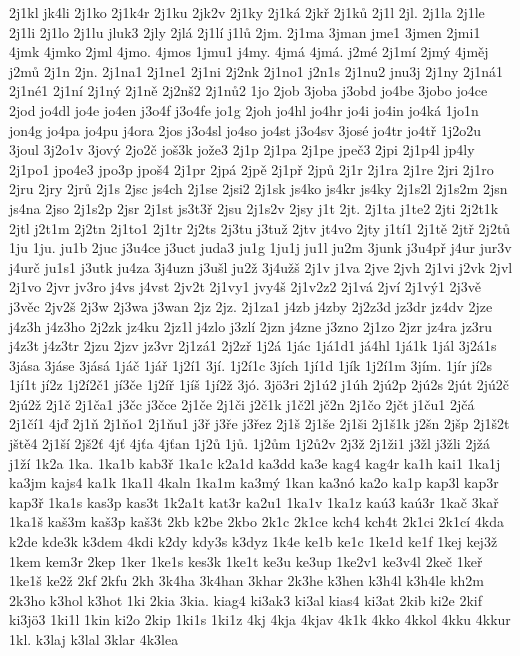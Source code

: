 2j1kl
jk4li
2j1ko
2j1k4r
2j1ku
2jk2v
2j1ky
2j1ká
2jkř
2j1ků
2j1l
2jl.
2j1la
2j1le
2j1li
2j1lo
2j1lu
jluk3
2jly
2jlá
2j1lí
j1lů
2jm.
2j1ma
3jman
jme1
3jmen
2jmi1
4jmk
4jmko
2jml
4jmo.
4jmos
1jmu1
j4my.
4jmá
4jmá.
j2mé
2j1mí
2jmý
4jměj
j2mů
2j1n
2jn.
2j1na1
2j1ne1
2j1ni
2j2nk
2j1no1
j2n1s
2j1nu2
jnu3j
2j1ny
2j1ná1
2j1né1
2j1ní
2j1ný
2j1ně
2j2nš2
2j1nů2
1jo
2job
3joba
j3obd
jo4be
3jobo
jo4ce
2jod
jo4dl
jo4e
jo4en
j3o4f
j3o4fe
jo1g
2joh
jo4hl
jo4hr
jo4i
jo4in
jo4ká
1jo1n
jon4g
jo4pa
jo4pu
j4ora
2jos
j3o4sl
jo4so
jo4st
j3o4sv
3josé
jo4tr
jo4tř
1j2o2u
3joul
3j2o1v
3jový
2jo2č
još3k
jože3
2j1p
2j1pa
2j1pe
jpeč3
2jpi
2j1p4l
jp4ly
2j1po1
jpo4e3
jpo3p
jpoš4
2j1pr
2jpá
2jpě
2j1př
2jpů
2j1r
2j1ra
2j1re
2jri
2j1ro
2jru
2jry
2jrů
2j1s
2jsc
js4ch
2j1se
2jsi2
2j1sk
js4ko
js4kr
js4ky
2j1s2l
2j1s2m
2jsn
js4na
2jso
2j1s2p
2jsr
2j1st
js3t3ř
2jsu
2j1s2v
2jsy
j1t
2jt.
2j1ta
j1te2
2jti
2j2t1k
2jtl
j2t1m
2j2tn
2j1to1
2j1tr
2j2ts
2j3tu
j3tuž
2jtv
jt4vo
2jty
j1tí1
2j1tě
2jtř
2j2tů
1ju
1ju.
ju1b
2juc
j3u4ce
j3uct
juda3
ju1g
1ju1j
ju1l
ju2m
3junk
j3u4př
j4ur
jur3v
j4urč
ju1s1
j3utk
ju4za
3j4uzn
j3ušl
ju2ž
3j4užš
2j1v
j1va
2jve
2jvh
2j1vi
j2vk
2jvl
2j1vo
2jvr
jv3ro
j4vs
j4vst
2jv2t
2j1vy1
jvy4š
2j1v2z2
2j1vá
2jví
2j1vý1
2j3vě
j3věc
2jv2š
2j3w
2j3wa
j3wan
2jz
2jz.
2j1za1
j4zb
j4zby
2j2z3d
jz3dr
jz4dv
2jze
j4z3h
j4z3ho
2j2zk
jz4ku
2jz1l
j4zlo
j3zlí
2jzn
j4zne
j3zno
2j1zo
2jzr
jz4ra
jz3ru
j4z3t
j4z3tr
2jzu
2jzv
jz3vr
2j1zá1
2j2zř
1j2á
1jác
1já1d1
já4hl
1já1k
1jál
3j2á1s
3jása
3jáse
3jásá
1jáč
1jář
1j2í1
3jí.
1j2í1c
3jích
1jí1d
1jík
1j2í1m
3jím.
1jír
jí2s
1jí1t
jí2z
1j2í2č1
jí3če
1j2íř
1jíš
1jí2ž
3jó.
3jö3ri
2j1ú2
j1úh
2jú2p
2jú2s
2jút
2jú2č
2jú2ž
2j1č
2j1ča1
j3čc
j3čce
2j1če
2j1či
j2č1k
j1č2l
jč2n
2j1čo
2jčt
j1ču1
2jčá
2j1čí1
4jď
2j1ň
2j1ňo1
2j1ňu1
j3ř
j3ře
j3řez
2j1š
2j1še
2j1ši
2j1š1k
j2šn
2jšp
2j1š2t
jště4
2j1ší
2jš2ť
4jť
4jťa
4jťan
1j2ů
1jů.
1j2ům
1j2ů2v
2j3ž
2j1ži1
j3žl
j3žli
2jžá
j1ží
1k2a
1ka.
1ka1b
kab3ř
1ka1c
k2a1d
ka3dd
ka3e
kag4
kag4r
ka1h
kai1
1ka1j
ka3jm
kajs4
ka1k
1ka1l
4kaln
1ka1m
ka3mý
1kan
ka3nó
ka2o
ka1p
kap3l
kap3r
kap3ř
1ka1s
kas3p
kas3t
1k2a1t
kat3r
ka2u1
1ka1v
1ka1z
kaú3
kaú3r
1kač
3kař
1ka1š
kaš3m
kaš3p
kaš3t
2kb
k2be
2kbo
2k1c
2k1ce
kch4
kch4t
2k1ci
2k1cí
4kda
k2de
kde3k
k3dem
4kdi
k2dy
kdy3s
k3dyz
1k4e
ke1b
ke1c
1ke1d
ke1f
1kej
kej3ž
1kem
kem3r
2kep
1ker
1ke1s
kes3k
1ke1t
ke3u
ke3up
1ke2v1
ke3v4l
2keč
1keř
1ke1š
ke2ž
2kf
2kfu
2kh
3k4ha
3k4han
3khar
2k3he
k3hen
k3h4l
k3h4le
kh2m
2k3ho
k3hol
k3hot
1ki
2kia
3kia.
kiag4
ki3ak3
ki3al
kias4
ki3at
2kib
ki2e
2kif
ki3jö3
1ki1l
1kin
ki2o
2kip
1ki1s
1ki1z
4kj
4kja
4kjav
4k1k
4kko
4kkol
4kku
4kkur
1kl.
k3laj
k3lal
3klar
4k3lea

